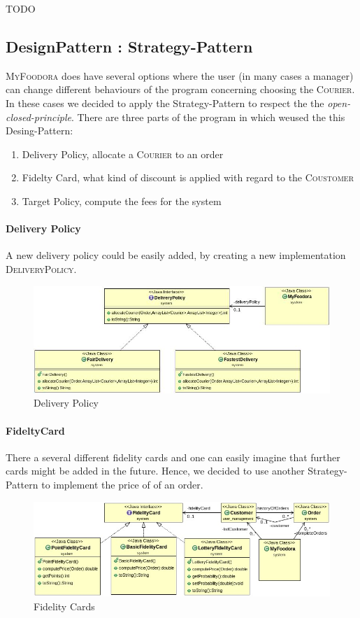 TODO

\subsection{DesignPattern : Strategy-Pattern}
\label{sub:designpattern_strategy_pattern}

\textsc{MyFoodora} does have several options where the user (in many cases a manager) can change
different behaviours of the program concerning choosing the \textsc{Courier}. In these
cases we decided to apply the Strategy-Pattern to respect the the \textit{open-closed-principle}.
There are three parts of the program in which weused the this Desing-Pattern:
\begin{enumerate}
	\item Delivery Policy, allocate a \textsc{Courier} to an order
	\item Fidelty Card, what kind of discount is applied with regard to the
		\textsc{Coustomer}
	\item Target Policy, compute the fees for the system 
\end{enumerate}

\paragraph{Delivery Policy}
\label{par:delivery_policy}
A new delivery policy could be easily added, by creating a new implementation
\textsc{DeliveryPolicy}.

\begin{figure}[H]
	\centering
	\includegraphics[width=1\linewidth]{./ima/deliverypolicy.jpg}
	\caption{Delivery Policy}
	\label{fig:deliveryPolicy}
\end{figure}

\paragraph{FideltyCard}
\label{par:fideltycard}

There a several different fidelity cards and one can easily imagine that further cards might be 
added in the future. Hence, we decided to use another Strategy-Pattern to implement the price of
of an order. 

\begin{figure}[H]
	\centering
	\includegraphics[width=1\linewidth]{./ima/fidelitycard.jpg}
	\caption{Fidelity Cards}
	\label{fig:fidelitycards}
\end{figure}
